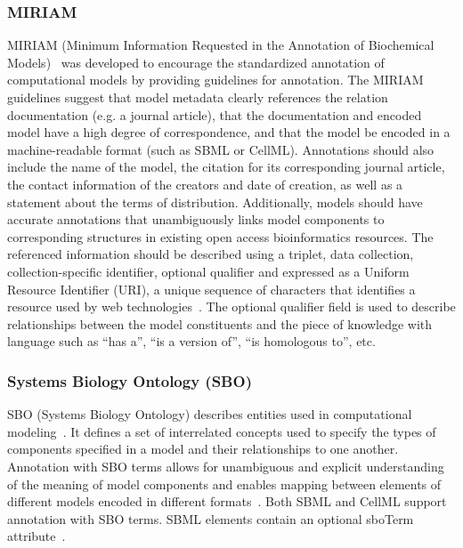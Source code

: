 \documentclass[12pt]{report}
\begin{document}
\subsubsection{MIRIAM}
 MIRIAM (Minimum Information Requested in the Annotation of Biochemical Models)~\cite{novere_minimum_2005} was developed to encourage the standardized annotation of computational models by providing guidelines for annotation. The MIRIAM guidelines suggest that model metadata clearly references the relation documentation (e.g. a journal article), that the documentation and encoded model have a high degree of correspondence, and that the model be encoded in a machine-readable format (such as SBML or CellML). Annotations should also include the name of the model, the citation for its corresponding journal article, the contact information of the creators and date of creation, as well as a statement about the terms of distribution. Additionally, models should have accurate annotations that unambiguously links model components to corresponding structures in existing open access bioinformatics resources. The referenced information should be described using a triplet, {data collection, collection-specific identifier, optional qualifier} and expressed as a Uniform Resource Identifier (URI), a unique sequence of characters that identifies a resource used by web technologies~\cite{berners2005uniform}. The optional qualifier field is used to describe relationships between the model constituents and the piece of knowledge with language such as ``has a'', ``is a version of'', ``is homologous to'', etc. 
 
\subsubsection{Systems Biology Ontology (SBO)}
SBO (Systems Biology Ontology) describes entities used in computational modeling~\cite{SBO, Curtout2011}. It defines a set of interrelated concepts used to specify the types of components specified in a model and their relationships to one another. Annotation with SBO terms allows for unambiguous and explicit understanding of the meaning of model components and enables mapping between elements of different models encoded in different formats~\cite{Curtout2011}. Both SBML and CellML support annotation with SBO terms.  SBML elements contain an optional sboTerm attribute~\cite{Curtout2011, Hucka2015, Wimalaratne2009}. 
\end{document}
